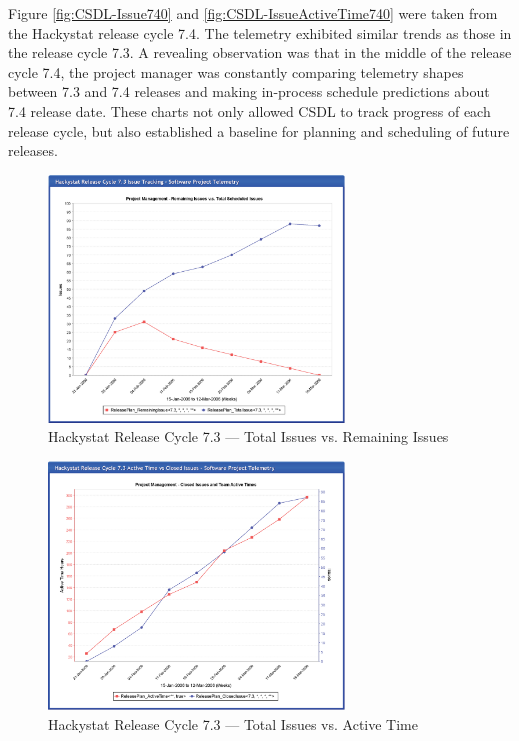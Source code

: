 Figure \ref{fig:CSDL-Issue740} and \ref{fig:CSDL-IssueActiveTime740} were taken from the Hackystat release cycle 7.4. The telemetry exhibited similar trends as those in the release cycle 7.3. A revealing observation was that in the middle of the release cycle 7.4, the project manager was constantly comparing telemetry shapes between 7.3 and 7.4 releases and making in-process schedule predictions about 7.4 release date. These charts not only allowed CSDL to track progress of each release cycle, but also established a baseline for planning and scheduling of future releases.

\begin{figure}[p]
  \center
  \includegraphics[width=0.70\textwidth]{figures/CSDL-Issue730}
  \caption{Hackystat Release Cycle 7.3 --- Total Issues vs. Remaining Issues} 
  \label{fig:CSDL-Issue730}
\end{figure}

\begin{figure}[p]
  \center
  \includegraphics[width=0.70\textwidth]{figures/CSDL-IssueActiveTime730}
  \caption{Hackystat Release Cycle 7.3 --- Total Issues vs. Active Time} 
  \label{fig:CSDL-IssueActiveTime730}
\end{figure}



